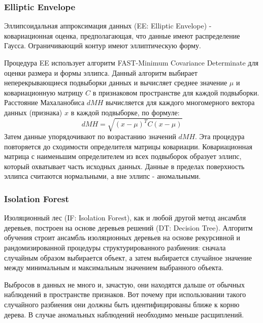 \documentclass[12pt]{article}
\begin{document}
    \subsubsection{Elliptic Envelope}
    \label{sec:Research:Model:EllipticEnvelope}

    \par Эллипсоидальная аппроксимация данных (EE: Elliptic Envelope) - ковариационная оценка, предполагающая, что данные имеют распределение Гаусса. Ограничивающий контур имеют эллиптическую форму. \\

    \par Процедура EE использует алгоритм FAST-Minimum Covariance Determinate для оценки размера и формы эллипса. Данный алгоритм выбирает неперекрывающиеся подвыборки данных и вычисляет среднее значение $\mu$ и ковариационную матрицу $C$ в признаковом пространстве для каждой подвыборки. Расстояние Махаланобиса $dMH$ вычисляется для каждого многомерного вектора данных (признака) $x$ в каждой подвыборке, по формуле:
    $$
    dMH = \sqrt{(x-\mu)^T C (x-\mu)}
    $$
    \noindent Затем данные упорядочивают по возрастанию значений $dMH$. Эта процедура повторяется до сходимости определителя матрицы ковариации. Ковариационная матрица с наименьшим определителем из всех подвыборок образует эллипс, который охватывает часть исходных данных. Данные в пределах поверхность эллипса считаются нормальными, а вне эллипс - аномальными.


    \subsubsection{Isolation Forest}
    \label{sec:Research:Model:IsolationForest}

    \par Изоляционный лес (IF: Isolation Forest), как и любой другой метод ансамбля деревьев, построен на основе деревьев решений (DT: Decision Tree). Алгоритм обучения строит ансамбль изоляционных деревьев на основе рекурсивной и рандомизированной процедуры структурированного разбиения: сначала случайным образом выбирается объект, а затем выбирается случайное значение между минимальным и максимальным значением выбранного объекта. \\

    \par Выбросов в данных не много и, зачастую, они находятся дальше от обычных наблюдений в пространстве признаков. Вот почему при использовании такого случайного разбиения они должны быть идентифицированы ближе к корню дерева. В случае аномальных наблюдений необходимо меньше расщиплений. \\
\end{document}
